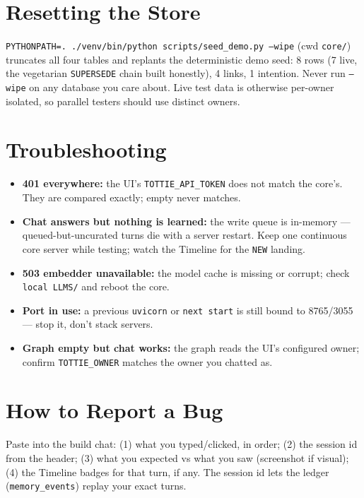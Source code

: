 \section{Resetting the Store}
\texttt{PYTHONPATH=. ./venv/bin/python scripts/seed\_demo.py --wipe} (cwd \texttt{core/})
truncates all four tables and replants the deterministic demo seed: 8 rows (7 live, the
vegetarian \texttt{SUPERSEDE} chain built honestly), 4 links, 1 intention. Never run
\texttt{--wipe} on any database you care about. Live test data is otherwise per-owner
isolated, so parallel testers should use distinct owners.

\section{Troubleshooting}
\begin{itemize}
  \item \textbf{401 everywhere:} the UI's \texttt{TOTTIE\_API\_TOKEN} does not match the
  core's. They are compared exactly; empty never matches.
  \item \textbf{Chat answers but nothing is learned:} the write queue is in-memory ---
  queued-but-uncurated turns die with a server restart. Keep one continuous core server
  while testing; watch the Timeline for the \texttt{NEW} landing.
  \item \textbf{503 embedder unavailable:} the model cache is missing or corrupt; check
  \texttt{local LLMS/} and reboot the core.
  \item \textbf{Port in use:} a previous \texttt{uvicorn} or \texttt{next start} is still
  bound to 8765/3055 --- stop it, don't stack servers.
  \item \textbf{Graph empty but chat works:} the graph reads the UI's configured owner;
  confirm \texttt{TOTTIE\_OWNER} matches the owner you chatted as.
\end{itemize}

\section{How to Report a Bug}
Paste into the build chat: (1) what you typed/clicked, in order; (2) the session id from
the header; (3) what you expected vs what you saw (screenshot if visual); (4) the
Timeline badges for that turn, if any. The session id lets the ledger
(\texttt{memory\_events}) replay your exact turns.
